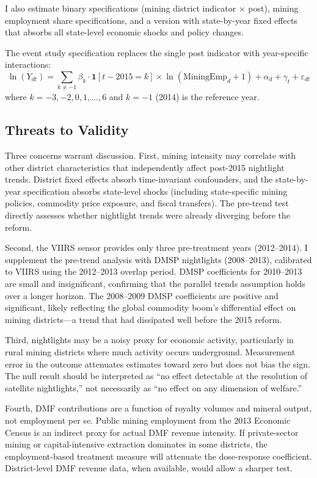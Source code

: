 \documentclass[12pt]{article}
\begin{document}
I also estimate binary specifications (mining district indicator $\times$ post), mining employment share specifications, and a version with state-by-year fixed effects that absorbs all state-level economic shocks and policy changes.

The event study specification replaces the single post indicator with year-specific interactions:
\begin{equation}
  \ln(Y_{dt}) = \sum_{k \neq -1} \beta_k \cdot \mathbf{1}[t - 2015 = k] \times \ln(\text{MiningEmp}_d + 1) + \alpha_d + \gamma_t + \varepsilon_{dt}
\end{equation}
where $k = -3, -2, 0, 1, \ldots, 6$ and $k = -1$ (2014) is the reference year.

\subsection{Threats to Validity}

Three concerns warrant discussion. First, mining intensity may correlate with other district characteristics that independently affect post-2015 nightlight trends. District fixed effects absorb time-invariant confounders, and the state-by-year specification absorbs state-level shocks (including state-specific mining policies, commodity price exposure, and fiscal transfers). The pre-trend test directly assesses whether nightlight trends were already diverging before the reform.

Second, the VIIRS sensor provides only three pre-treatment years (2012--2014). I supplement the pre-trend analysis with DMSP nightlights (2008--2013), calibrated to VIIRS using the 2012--2013 overlap period. DMSP coefficients for 2010--2013 are small and insignificant, confirming that the parallel trends assumption holds over a longer horizon. The 2008--2009 DMSP coefficients are positive and significant, likely reflecting the global commodity boom's differential effect on mining districts---a trend that had dissipated well before the 2015 reform.

Third, nightlights may be a noisy proxy for economic activity, particularly in rural mining districts where much activity occurs underground. Measurement error in the outcome attenuates estimates toward zero but does not bias the sign. The null result should be interpreted as ``no effect detectable at the resolution of satellite nightlights,'' not necessarily as ``no effect on any dimension of welfare.''

Fourth, DMF contributions are a function of royalty volumes and mineral output, not employment per se. Public mining employment from the 2013 Economic Census is an indirect proxy for actual DMF revenue intensity. If private-sector mining or capital-intensive extraction dominates in some districts, the employment-based treatment measure will attenuate the dose-response coefficient. District-level DMF revenue data, when available, would allow a sharper test.
\end{document}

